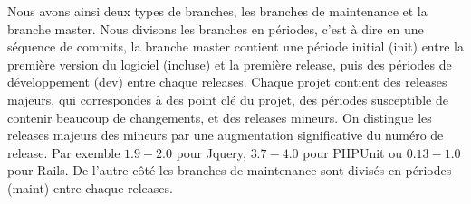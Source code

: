 Nous avons ainsi deux types de branches, les branches de maintenance et la branche master. Nous divisons les branches en périodes, c'est à dire en une séquence de commits, la branche master contient une période initial (init) entre la première version du logiciel (incluse) et la première release, puis des périodes de développement (dev) entre chaque releases. Chaque projet contient des releases majeurs, qui correspondes à des point clé du projet, des périodes susceptible de contenir beaucoup de changements, et des releases mineurs. On distingue les releases majeurs des mineurs par une augmentation significative du numéro de release. Par exemble $1.9-2.0$ pour Jquery, $3.7-4.0$ pour PHPUnit ou $0.13-1.0$ pour Rails. De l'autre côté les branches de maintenance sont divisés en périodes (maint) entre chaque releases.\\
 
